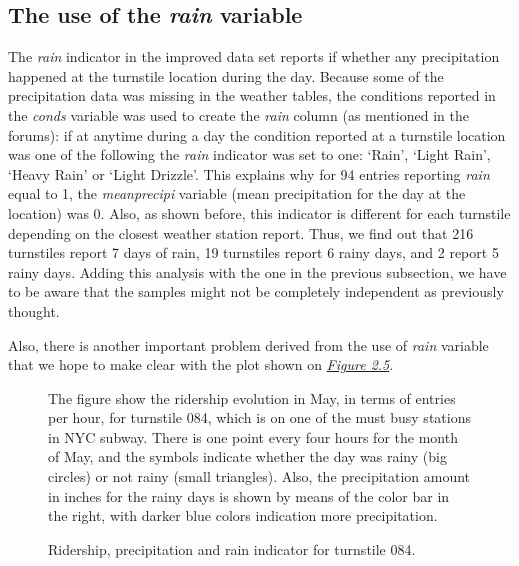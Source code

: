 \documentclass[a4paper,12pt,english]{sphinxmanual}
\begin{document}
\subsection{The use of the \emph{rain} variable}
\label{section1:the-use-of-the-rain-variable}
The \emph{rain} indicator in the improved data set reports if whether any precipitation
happened at the turnstile location during the day. Because some of the
precipitation data was missing in the weather tables, the conditions
reported in the \emph{conds} variable was used to create the \emph{rain} column (as
mentioned in the forums): if at anytime during a day the condition reported at
a turnstile location was one of the following the \emph{rain} indicator was set to one:
`Rain', `Light Rain', `Heavy Rain' or `Light Drizzle'. This explains why for 94
entries reporting \emph{rain} equal to 1, the \emph{meanprecipi} variable (mean precipitation
for the day at the location) was 0. Also, as shown before, this indicator is different
for each turnstile depending on the closest weather station report. Thus, we
find out that 216 turnstiles report 7 days of rain, 19 turnstiles report 6 rainy
days, and 2 report 5 rainy days. Adding this analysis with the one in the previous
subsection, we have to be aware that the samples might not be completely independent
as previously thought.

Also, there is another important problem derived from the use of \emph{rain}
variable that we hope to make clear with the plot shown on
{\hyperref[section1:figure25]{\emph{Figure 2.5}}}.
\begin{figure}[htbp]
\centering
\capstart

\caption{Ridership, precipitation and rain indicator for turnstile 084.}{\small 
The figure show the ridership evolution in May, in terms of entries per hour,
for turnstile 084, which is on one of the must busy stations in NYC subway.
There is one point every four hours for the month of May, and the symbols indicate
whether the day was rainy (big circles) or not rainy (small triangles). Also,
the precipitation amount in inches for the rainy days is shown by means of the
color bar in the right, with darker blue colors indication more precipitation.
}\label{section1:figure25}\end{figure}
\end{document}
